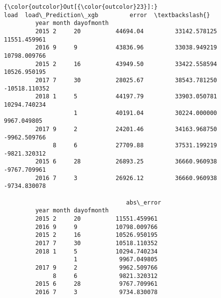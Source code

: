 \documentclass[11pt]{article}
\begin{document}
\begin{Verbatim}[commandchars=\\\{\}]
{\color{outcolor}Out[{\color{outcolor}23}]:}                            load  load\_Prediction\_xgb         error  \textbackslash{}
         year month dayofmonth                                                
         2015 2     20          44694.04         33142.578125  11551.459961   
         2016 9     9           43836.96         33038.949219  10798.009766   
         2015 2     16          43949.50         33422.558594  10526.950195   
         2017 7     30          28025.67         38543.781250 -10518.110352   
         2018 1     5           44197.79         33903.050781  10294.740234   
                    1           40191.04         30224.000000   9967.049805   
         2017 9     2           24201.46         34163.968750  -9962.509766   
              8     6           27709.88         37531.199219  -9821.320312   
         2015 6     28          26893.25         36660.960938  -9767.709961   
         2016 7     3           26926.12         36660.960938  -9734.830078   
         
                                   abs\_error  
         year month dayofmonth                
         2015 2     20          11551.459961  
         2016 9     9           10798.009766  
         2015 2     16          10526.950195  
         2017 7     30          10518.110352  
         2018 1     5           10294.740234  
                    1            9967.049805  
         2017 9     2            9962.509766  
              8     6            9821.320312  
         2015 6     28           9767.709961  
         2016 7     3            9734.830078  
\end{Verbatim}
            
\end{document}
